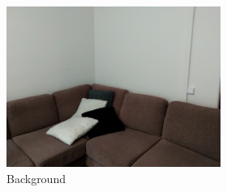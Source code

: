 \begin{figure}[]
\begin{subfigure}{\textwidth}
        \begin{subfigure}{0.2\textwidth}
            \centering
            \includegraphics[width=\textwidth]{images/04-experiment02/sofa/bg.jpg}
            \caption*{Background}
        \end{subfigure}
        \hfill
        \begin{subfigure}{0.78\textwidth}
            \centering
            \begin{subfigure}{0.32\textwidth}
                \centering
\end{subfigure}
\end{subfigure}
\end{subfigure}
\end{figure}
